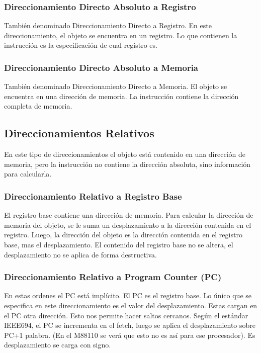 \documentclass[a4paper,11pt,spanish]{report}
\begin{document}
\subsubsection{Direccionamiento Directo Absoluto a Registro}
También denominado Direccionamiento Directo a Registro. En este direccionamiento, el objeto se encuentra en un registro. Lo que contienen la instrucción es la especificación de cual registro es.
\subsubsection{Direccionamiento Directo Absoluto a Memoria}
También denominado Direccionamiento Directo a Memoria. El objeto se encuentra en una dirección de memoria. La instrucción contiene la dirección completa de memoria.
\subsection{Direccionamientos Relativos}
En este tipo de direccionamientos el objeto está contenido en una dirección de memoria, pero la instrucción no contiene la dirección absoluta, sino información para calcularla.
\subsubsection{Direccionamiento Relativo a Registro Base}
El registro base contiene una dirección de memoria. Para calcular la dirección de memoria del objeto, se le suma un desplazamiento a la dirección contenida en el registro. Luego, la dirección del objeto es la dirección contenida en el registro base, mas el desplazamiento. El contenido del registro base no se altera, el desplazamiento no se aplica de forma destructiva.
\subsubsection{Direccionamiento Relativo a Program Counter (PC)}
En estas ordenes el PC está implícito. El PC es el registro base. Lo único que se especifica en este direccionamiento es el valor del desplazamiento. Estas cargan en el PC otra dirección. Esto nos permite hacer saltos cercanos. Según el estándar IEEE694, el PC se incrementa en el fetch, luego se aplica el desplazamiento sobre PC+1 palabra. (En el M88110 se verá que esto no es así para ese procesador). Es desplazamiento se carga con signo.
\end{document}
